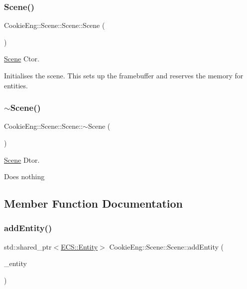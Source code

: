 \subsubsection{\texorpdfstring{Scene()}{Scene()}}
{\footnotesize\ttfamily Cookie\+Eng\+::\+Scene\+::\+Scene\+::\+Scene (\begin{DoxyParamCaption}{ }\end{DoxyParamCaption})}



\hyperlink{class_cookie_eng_1_1_scene_1_1_scene}{Scene} Ctor. 

Initialises the scene. This sets up the framebuffer and reserves the memory for entities. \mbox{\label{class_cookie_eng_1_1_scene_1_1_scene_a2aaed9f1b869d7c35b9d3fada5bf198a}} 
\subsubsection{\texorpdfstring{$\sim$\+Scene()}{~Scene()}}
{\footnotesize\ttfamily Cookie\+Eng\+::\+Scene\+::\+Scene\+::$\sim$\+Scene (\begin{DoxyParamCaption}{ }\end{DoxyParamCaption})}



\hyperlink{class_cookie_eng_1_1_scene_1_1_scene}{Scene} Dtor. 

Does nothing 

\subsection{Member Function Documentation}
\mbox{\label{class_cookie_eng_1_1_scene_1_1_scene_a2cccad4cc0411852e327b249b12b9bc3}} 
\subsubsection{\texorpdfstring{add\+Entity()}{addEntity()}}
{\footnotesize\ttfamily std\+::shared\+\_\+ptr$<$\hyperlink{class_cookie_eng_1_1_e_c_s_1_1_entity}{E\+C\+S\+::\+Entity}$>$ Cookie\+Eng\+::\+Scene\+::\+Scene\+::add\+Entity (\begin{DoxyParamCaption}\item[{\hyperlink{class_cookie_eng_1_1_e_c_s_1_1_entity}{E\+C\+S\+::\+Entity} \&}]{\+\_\+entity }\end{DoxyParamCaption})}



